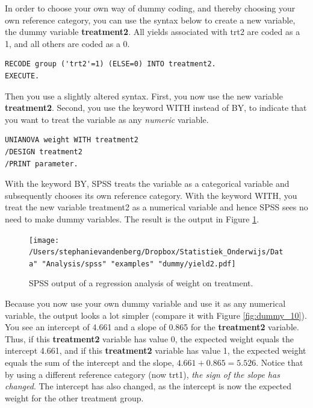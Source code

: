 \documentclass[]{book}\usepackage[]{graphicx}\usepackage[]{color}
\begin{document}
In order to choose your own way of dummy coding, and thereby choosing your own reference category, you can use the syntax below to create a new variable, the dummy variable \textbf{treatment2}. All yields associated with trt2 are coded as a 1, and all others are coded as a 0.

\begin{verbatim}
RECODE group ('trt2'=1) (ELSE=0) INTO treatment2.
EXECUTE.
\end{verbatim}

Then you use a slightly altered syntax. First, you now use the new variable \textbf{treatment2}. Second, you use the keyword WITH instead of BY, to indicate that you want to treat the variable as any \textit{numeric} variable.

\begin{verbatim}
UNIANOVA weight WITH treatment2 
/DESIGN treatment2
/PRINT parameter.
\end{verbatim}

With the keyword BY, SPSS treats the variable as a categorical variable and subsequently chooses its own reference category. With the keyword WITH, you treat the new variable treatment2 as a numerical variable and hence SPSS sees no need to make dummy variables. The result is the output in Figure \ref{fig:dummy_11}.


\begin{figure}[h]
    \begin{center}
       \texttt{[image: /Users/stephanievandenberg/Dropbox/Statistiek\_Onderwijs/Data" "Analysis/spss" "examples" "dummy/yield2.pdf]}
    \end{center}
 \caption{SPSS output of a regression analysis of weight on treatment.}
 \label{fig:dummy_11}
\end{figure}

Because you now use your own dummy variable and use it as any numerical variable, the output looks a lot simpler (compare it with Figure \ref{fig:dummy_10}). You see an intercept of 4.661 and a slope of 0.865 for the \textbf{treatment2} variable. Thus, if this \textbf{treatment2} variable has value 0, the expected weight equals the intercept 4.661, and if this \textbf{treatment2} variable has value 1, the expected weight equals the sum of the intercept and the slope, $4.661 + 0.865 = 5.526$. Notice that by using a different reference category (now trt1), \textit{the sign of the slope has changed}. The intercept has also changed, as the intercept is now the expected weight for the other treatment group. 
\end{document}
